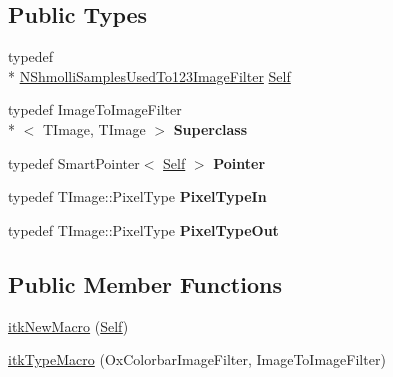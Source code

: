 \subsection*{Public Types}
\begin{DoxyCompactItemize}
\item 
typedef \\*
\hyperlink{classitk_1_1_n_shmolli_samples_used_to123_image_filter}{N\-Shmolli\-Samples\-Used\-To123\-Image\-Filter} \hyperlink{classitk_1_1_n_shmolli_samples_used_to123_image_filter_aa227171fdb715a86680dae7b2aeb60ca}{Self}
\item 
\hypertarget{classitk_1_1_n_shmolli_samples_used_to123_image_filter_a6eb48e2e880a9eaa080bcd6c97f1b62f}{typedef Image\-To\-Image\-Filter\\*
$<$ T\-Image, T\-Image $>$ {\bfseries Superclass}}\label{classitk_1_1_n_shmolli_samples_used_to123_image_filter_a6eb48e2e880a9eaa080bcd6c97f1b62f}

\item 
\hypertarget{classitk_1_1_n_shmolli_samples_used_to123_image_filter_a1b3d0c2271ece8ef8dec873c6ebaec3b}{typedef Smart\-Pointer$<$ \hyperlink{classitk_1_1_n_shmolli_samples_used_to123_image_filter_aa227171fdb715a86680dae7b2aeb60ca}{Self} $>$ {\bfseries Pointer}}\label{classitk_1_1_n_shmolli_samples_used_to123_image_filter_a1b3d0c2271ece8ef8dec873c6ebaec3b}

\item 
\hypertarget{classitk_1_1_n_shmolli_samples_used_to123_image_filter_acc79dbf838828af74a893d267d18e3f3}{typedef T\-Image\-::\-Pixel\-Type {\bfseries Pixel\-Type\-In}}\label{classitk_1_1_n_shmolli_samples_used_to123_image_filter_acc79dbf838828af74a893d267d18e3f3}

\item 
\hypertarget{classitk_1_1_n_shmolli_samples_used_to123_image_filter_ad1008cfca5a90336b303c2fa1c7ae2ec}{typedef T\-Image\-::\-Pixel\-Type {\bfseries Pixel\-Type\-Out}}\label{classitk_1_1_n_shmolli_samples_used_to123_image_filter_ad1008cfca5a90336b303c2fa1c7ae2ec}

\end{DoxyCompactItemize}
\subsection*{Public Member Functions}
\begin{DoxyCompactItemize}
\item 
\hyperlink{classitk_1_1_n_shmolli_samples_used_to123_image_filter_a0fdd8bb40334c5a00bed7e53b3ce41b9}{itk\-New\-Macro} (\hyperlink{classitk_1_1_n_shmolli_samples_used_to123_image_filter_aa227171fdb715a86680dae7b2aeb60ca}{Self})
\item 
\hyperlink{classitk_1_1_n_shmolli_samples_used_to123_image_filter_a88bd0d5af2509a14869d466a70bdbb25}{itk\-Type\-Macro} (Ox\-Colorbar\-Image\-Filter, Image\-To\-Image\-Filter)
\end{DoxyCompactItemize}
